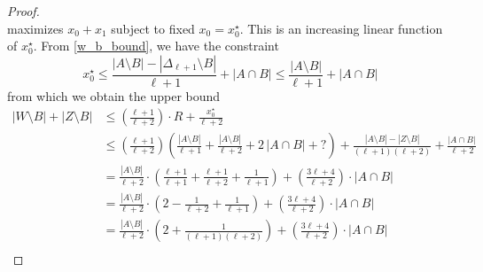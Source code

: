 \documentclass{patmorin}
\newcommand{\pat}[1]{\textcolor{Blue}{[Pat: #1]}}
\newcommand{\hussein}[1]{\textcolor{purple}{HH: #1}}
\begin{document}
\begin{proof}
\[  \]
  maximizes $x_0+x_1$ subject to fixed $x_0=x_0^{\star}$.
  This is an increasing linear function of $x_0^{\star}$.  From \eqref{w_b_bound}, we have the constraint
  \[
     x_0^\star \le
     \frac{|A\setminus B|-|\Delta_{\ell+1}\setminus B|}{\ell+1}+|A\cap B|
     \le \frac{|A\setminus B|}{\ell+1}+|A\cap B|
  \]
  from which we obtain the upper bound
  \begin{align*}
    |W\setminus B|+|Z\setminus B|
    & \le \left(\frac{\ell+1}{\ell+2}\right)\cdot R +
    \frac{x_0^\star}{\ell+2} \\
    & \le \left(\frac{\ell+1}{\ell+2}\right)\left(\frac{|A\setminus B|}{\ell+1}+\frac{|A\setminus B|}{\ell+2}+2\,|A\cap B|+{?}\right)+\frac{|A\setminus B|-|Z\setminus B|}{(\ell+1)
    (\ell+2)}
    + \frac{|A\cap B|}{\ell+2}
    \\
    & = \frac{|A\setminus B|}{\ell+2}\cdot\left(\frac{\ell+1}{\ell+1}+\frac{\ell+1}{\ell+2}+\frac{1}{\ell+1}\right) +\left(\frac{3\ell+4}{\ell+2}\right)\cdot |A\cap B|  \\
    & = \frac{|A\setminus B|}{\ell+2}\cdot\left(2-\frac{1}{\ell+2}+\frac{1}{\ell+1}\right) +\left(\frac{3\ell+4}{\ell+2}\right)\cdot |A\cap B|  \\
    & = \frac{|A\setminus B|}{\ell+2}\cdot\left(2+\frac{1}{(\ell+1)(\ell+2)}\right) +\left(\frac{3\ell+4}{\ell+2}\right)\cdot |A\cap B|  \\

\end{align*}
\end{proof}
\end{document}
